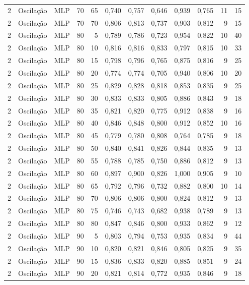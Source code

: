 \begin{longtable}{@{}rllrrrrrrrrr@{}}
2 & Oscilação & MLP & 70 & 65 & 0,740 & 0,757 & 0,646 & 0,939 & 0,765 & 11 & 15 \\
2 & Oscilação & MLP & 70 & 70 & 0,806 & 0,813 & 0,737 & 0,903 & 0,812 & 9 & 15 \\
2 & Oscilação & MLP & 80 & 5 & 0,789 & 0,786 & 0,723 & 0,954 & 0,822 & 10 & 40 \\
2 & Oscilação & MLP & 80 & 10 & 0,816 & 0,816 & 0,833 & 0,797 & 0,815 & 10 & 33 \\
2 & Oscilação & MLP & 80 & 15 & 0,798 & 0,796 & 0,765 & 0,875 & 0,816 & 9 & 25 \\
2 & Oscilação & MLP & 80 & 20 & 0,774 & 0,774 & 0,705 & 0,940 & 0,806 & 10 & 20 \\
2 & Oscilação & MLP & 80 & 25 & 0,829 & 0,828 & 0,818 & 0,853 & 0,835 & 9 & 25 \\
2 & Oscilação & MLP & 80 & 30 & 0,833 & 0,833 & 0,805 & 0,886 & 0,843 & 9 & 18 \\
2 & Oscilação & MLP & 80 & 35 & 0,821 & 0,820 & 0,775 & 0,912 & 0,838 & 9 & 16 \\
2 & Oscilação & MLP & 80 & 40 & 0,846 & 0,848 & 0,800 & 0,912 & 0,852 & 10 & 16 \\
2 & Oscilação & MLP & 80 & 45 & 0,779 & 0,780 & 0,808 & 0,764 & 0,785 & 9 & 18 \\
2 & Oscilação & MLP & 80 & 50 & 0,840 & 0,841 & 0,826 & 0,844 & 0,835 & 9 & 13 \\
2 & Oscilação & MLP & 80 & 55 & 0,788 & 0,785 & 0,750 & 0,886 & 0,812 & 9 & 13 \\
2 & Oscilação & MLP & 80 & 60 & 0,897 & 0,900 & 0,826 & 1,000 & 0,905 & 9 & 10 \\
2 & Oscilação & MLP & 80 & 65 & 0,792 & 0,796 & 0,732 & 0,882 & 0,800 & 10 & 14 \\
2 & Oscilação & MLP & 80 & 70 & 0,806 & 0,806 & 0,800 & 0,824 & 0,812 & 9 & 13 \\
2 & Oscilação & MLP & 80 & 75 & 0,746 & 0,743 & 0,682 & 0,938 & 0,789 & 9 & 13 \\
2 & Oscilação & MLP & 80 & 80 & 0,847 & 0,846 & 0,800 & 0,933 & 0,862 & 9 & 12 \\
2 & Oscilação & MLP & 90 & 5 & 0,803 & 0,794 & 0,753 & 0,935 & 0,834 & 9 & 44 \\
2 & Oscilação & MLP & 90 & 10 & 0,820 & 0,821 & 0,846 & 0,805 & 0,825 & 9 & 35 \\
2 & Oscilação & MLP & 90 & 15 & 0,836 & 0,833 & 0,820 & 0,885 & 0,851 & 9 & 24 \\
2 & Oscilação & MLP & 90 & 20 & 0,821 & 0,814 & 0,772 & 0,935 & 0,846 & 9 & 18 \\

\end{longtable}
